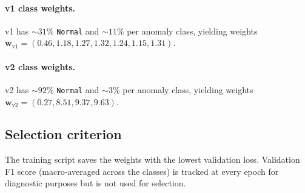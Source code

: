\paragraph{v1 class weights.} v1 has $\sim 31\%$ \texttt{Normal} and
$\sim 11\%$ per anomaly class, yielding weights
$\mathbf{w}_{\text{v1}} = (0.46, 1.18, 1.27, 1.32, 1.24, 1.15, 1.31)$.

\paragraph{v2 class weights.} v2 has $\sim 92\%$ \texttt{Normal} and
$\sim 3\%$ per anomaly class, yielding weights
$\mathbf{w}_{\text{v2}} = (0.27, 8.51, 9.37, 9.63)$.

\subsection{Selection criterion}

The training script saves the weights with the lowest validation loss.
Validation F1 score (macro-averaged across the classes) is tracked at
every epoch for diagnostic purposes but is not used for selection.
